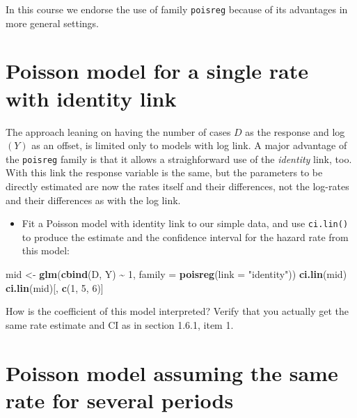 \documentclass[
]{book}
\newenvironment{Shaded}{\begin{snugshade}}{\end{snugshade}}
\newcommand{\AttributeTok}[1]{\textcolor[rgb]{0.13,0.29,0.53}{#1}}
\newcommand{\DecValTok}[1]{\textcolor[rgb]{0.00,0.00,0.81}{#1}}
\newcommand{\FunctionTok}[1]{\textcolor[rgb]{0.13,0.29,0.53}{\textbf{#1}}}
\newcommand{\NormalTok}[1]{#1}
\newcommand{\OtherTok}[1]{\textcolor[rgb]{0.56,0.35,0.01}{#1}}
\newcommand{\SpecialCharTok}[1]{\textcolor[rgb]{0.81,0.36,0.00}{\textbf{#1}}}
\newcommand{\StringTok}[1]{\textcolor[rgb]{0.31,0.60,0.02}{#1}}
\providecommand{\tightlist}{%
  \setlength{\itemsep}{0pt}\setlength{\parskip}{0pt}}
\begin{document}
In this course we endorse the use of family \texttt{poisreg} because of its advantages in more general settings.

\section{Poisson model for a single rate with identity link}\label{poisson-model-for-a-single-rate-with-identity-link}

The approach leaning on having the number of cases \(D\) as the response and log\((Y)\) as an offset,
is limited only to models with log link. A major advantage of the \texttt{poisreg} family is that it allows
a straighforward use of the \emph{identity} link, too. With this link the response variable is the same, but
the parameters to be directly estimated are now the rates itself and their differences, not the log-rates
and their differences as with the log link.

\begin{itemize}
\tightlist
\item
  Fit a Poisson model with identity link to our simple data, and
  use \texttt{ci.lin()} to produce the estimate and the
  confidence interval for the hazard rate from this model:
\end{itemize}

\begin{Shaded}
\begin{Highlighting}[]
\NormalTok{mid }\OtherTok{\textless{}{-}} \FunctionTok{glm}\NormalTok{(}\FunctionTok{cbind}\NormalTok{(D, Y) }\SpecialCharTok{\textasciitilde{}} \DecValTok{1}\NormalTok{, }\AttributeTok{family =} \FunctionTok{poisreg}\NormalTok{(}\AttributeTok{link =} \StringTok{"identity"}\NormalTok{))}
\FunctionTok{ci.lin}\NormalTok{(mid)}
\FunctionTok{ci.lin}\NormalTok{(mid)[, }\FunctionTok{c}\NormalTok{(}\DecValTok{1}\NormalTok{, }\DecValTok{5}\NormalTok{, }\DecValTok{6}\NormalTok{)]}
\end{Highlighting}
\end{Shaded}

How is the coefficient of this model interpreted?
Verify that you actually get the same rate estimate and CI as in section 1.6.1, item 1.

\section{Poisson model assuming the same rate for several periods}\label{poisson-model-assuming-the-same-rate-for-several-periods}
\end{document}
